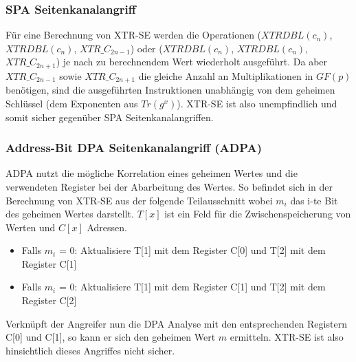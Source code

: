 \documentclass[10pt,        %
               a4paper,     %
               journal,     %
               ]{IEEEtran}
\begin{document}
\subsubsection{SPA Seitenkanalangriff}
Für eine Berechnung von XTR-SE werden die Operationen ($XTRDBL(c_n)$, $XTRDBL(c_n)$, $XTR\_C_{2n-1}$) oder ($XTRDBL(c_n)$, $XTRDBL(c_n)$, $XTR\_C_{2n+1}$) je nach zu berechnendem Wert wiederholt ausgeführt. Da aber $XTR\_C_{2n-1}$ sowie $XTR\_C_{2n+1}$ die gleiche Anzahl an Multiplikationen in $GF(p)$ benötigen, sind die ausgeführten Instruktionen unabhängig von dem geheimen Schlüssel (dem Exponenten aus $Tr(g^x)$).
XTR-SE ist also unempfindlich und somit sicher gegenüber SPA Seitenkanalangriffen.


\subsubsection{Address-Bit DPA Seitenkanalangriff (ADPA)}
ADPA nutzt die mögliche Korrelation eines geheimen Wertes und die verwendeten Register bei der Abarbeitung des Wertes. So befindet sich 
in der Berechnung von XTR-SE aus \cite{xtr-explanation} der folgende Teilausschnitt wobei $m_i$ das i-te Bit des geheimen Wertes darstellt. $T[x]$ ist ein Feld für die Zwischenspeicherung von Werten und $C[x]$ Adressen.

\begin{itemize}
\item Falls $m_i$ = 0: Aktualisiere T[1] mit dem Register C[0] und T[2] mit dem Register C[1]
\item Falls $m_i$ = 0: Aktualisiere T[1] mit dem Register C[1] und T[2] mit dem Register C[2]
\end{itemize}

Verknüpft der Angreifer nun die DPA Analyse mit den entsprechenden Registern C[0] und C[1], so kann er sich den geheimen Wert $m$ ermitteln.
XTR-SE ist also hinsichtlich dieses Angriffes nicht sicher.\cite{side-channel2}
\end{document}
